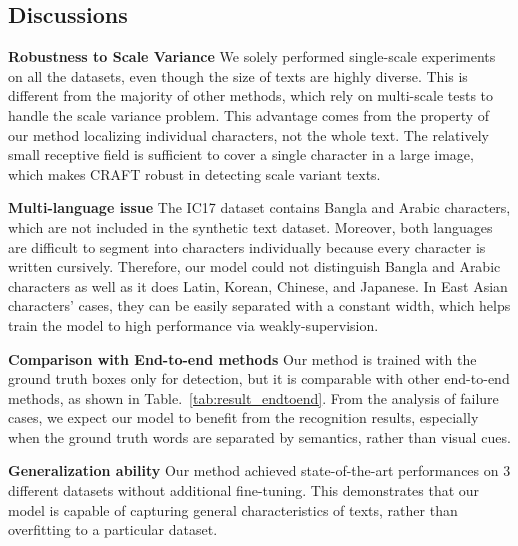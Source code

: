 \documentclass[10pt,twocolumn,letterpaper]{article}
\begin{document}
\subsection{Discussions}

\noindent\textbf{Robustness to Scale Variance} We solely performed single-scale experiments on all the datasets, even though the size of texts are highly diverse. This is different from the majority of other methods, which rely on multi-scale tests to handle the scale variance problem. This advantage comes from the property of our method localizing individual characters, not the whole text. The relatively small receptive field is sufficient to cover a single character in a large image, which makes CRAFT robust in detecting scale variant texts.

\noindent\textbf{Multi-language issue} The IC17 dataset contains Bangla and Arabic characters, which are not included in the synthetic text dataset. Moreover, both languages are difficult to segment into characters individually because every character is written cursively. Therefore, our model could not distinguish Bangla and Arabic characters as well as it does Latin, Korean, Chinese, and Japanese.
In East Asian characters' cases, they can be easily separated with a constant width, which helps train the model to high performance via weakly-supervision.





\noindent\textbf{\bf Comparison with End-to-end methods} Our method is trained with the ground truth boxes only for detection, but it is comparable with other end-to-end methods, as shown in Table.~\ref{tab:result_endtoend}. From the analysis of failure cases, we expect our model to benefit from the recognition results, especially when the ground truth words are separated by semantics, rather than visual cues.





\noindent\textbf{Generalization ability}
Our method achieved state-of-the-art performances on 3 different datasets without additional fine-tuning. This demonstrates that our model is capable of capturing general characteristics of texts, rather than overfitting to a particular dataset.
\end{document}
